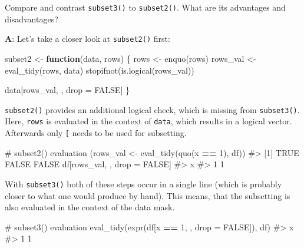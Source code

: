 \documentclass[
]{krantz}
\makeatletter
\newenvironment{Shaded}{\begin{snugshade}}{\end{snugshade}}
\newcommand{\CommentTok}[1]{\textcolor[rgb]{0.56,0.35,0.01}{\textit{#1}}}
\newcommand{\ControlFlowTok}[1]{\textcolor[rgb]{0.13,0.29,0.53}{\textbf{#1}}}
\newcommand{\DataTypeTok}[1]{\textcolor[rgb]{0.13,0.29,0.53}{#1}}
\newcommand{\DecValTok}[1]{\textcolor[rgb]{0.00,0.00,0.81}{#1}}
\newcommand{\KeywordTok}[1]{\textcolor[rgb]{0.13,0.29,0.53}{\textbf{#1}}}
\newcommand{\NormalTok}[1]{#1}
\newcommand{\OperatorTok}[1]{\textcolor[rgb]{0.81,0.36,0.00}{\textbf{#1}}}
\newcommand{\OtherTok}[1]{\textcolor[rgb]{0.56,0.35,0.01}{#1}}
\newcommand{\StringTok}[1]{\textcolor[rgb]{0.31,0.60,0.02}{#1}}
\newenvironment{kframe}{%
\medskip{}
\setlength{\fboxsep}{.8em}
 \def\at@end@of@kframe{}%
 \ifinner\ifhmode%
  \def\at@end@of@kframe{\end{minipage}}%
  \begin{minipage}{\columnwidth}%
 \fi\fi%
 \def\FrameCommand##1{\hskip\@totalleftmargin \hskip-\fboxsep
 \colorbox{shadecolor}{##1}\hskip-\fboxsep
     \hskip-\linewidth \hskip-\@totalleftmargin \hskip\columnwidth}%
 \MakeFramed {\advance\hsize-\width
   \@totalleftmargin\z@ \linewidth\hsize
   \@setminipage}}%
 {\par\unskip\endMakeFramed%
 \at@end@of@kframe}
\renewenvironment{Shaded}{\begin{kframe}}{\end{kframe}}
\renewcommand{\KeywordTok} [1]{\textcolor[rgb]{0.00,0.44,0.13}{{#1}}}
\renewcommand{\DataTypeTok}[1]{\textcolor[rgb]{0.56,0.13,0.00}{{#1}}}
\renewcommand{\DecValTok}  [1]{\textcolor[rgb]{0.25,0.63,0.44}{{#1}}}
\renewcommand{\StringTok}  [1]{\textcolor[rgb]{0.25,0.44,0.63}{{#1}}}
\renewcommand{\CommentTok} [1]{\textcolor[rgb]{0.38,0.63,0.69}{{#1}}}
\renewcommand{\OtherTok}   [1]{\textcolor[rgb]{0.00,0.44,0.13}{{#1}}}
\renewcommand{\NormalTok}  [1]{{#1}}
\makeatother
\begin{document}
Compare and contrast \texttt{subset3()} to \texttt{subset2()}. What are its advantages and disadvantages?

\textbf{{A}}: Let's take a closer look at \texttt{subset2()} first:

\begin{Shaded}
\begin{Highlighting}[]
\NormalTok{subset2 <-}\StringTok{ }\ControlFlowTok{function}\NormalTok{(data, rows) \{}
\NormalTok{  rows <-}\StringTok{ }\KeywordTok{enquo}\NormalTok{(rows)}
\NormalTok{  rows_val <-}\StringTok{ }\KeywordTok{eval_tidy}\NormalTok{(rows, data)}
  \KeywordTok{stopifnot}\NormalTok{(}\KeywordTok{is.logical}\NormalTok{(rows_val))}
  
\NormalTok{  data[rows_val, , drop =}\StringTok{ }\OtherTok{FALSE}\NormalTok{]}
\NormalTok{\}}
\end{Highlighting}
\end{Shaded}

\texttt{subset2()} provides an additional logical check, which is missing from \texttt{subset3()}. Here, \texttt{rows} is evaluated in the context of \texttt{data}, which results in a logical vector. Afterwards only \texttt{{[}} needs to be used for subsetting.

\begin{Shaded}
\begin{Highlighting}[]
\CommentTok{# subset2() evaluation}
\NormalTok{(rows_val <-}\StringTok{ }\KeywordTok{eval_tidy}\NormalTok{(}\KeywordTok{quo}\NormalTok{(x }\OperatorTok{==}\StringTok{ }\DecValTok{1}\NormalTok{), df))}
\CommentTok{#> [1]  TRUE FALSE FALSE}
\NormalTok{df[rows_val, , drop =}\StringTok{ }\OtherTok{FALSE}\NormalTok{]}
\CommentTok{#>   x}
\CommentTok{#> 1 1}
\end{Highlighting}
\end{Shaded}

With \texttt{subset3()} both of these steps occur in a single line (which is probably closer to what one would produce by hand). This means, that the subsetting is also evaluated in the context of the data mask.

\begin{Shaded}
\begin{Highlighting}[]
\CommentTok{# subset3() evaluation}
\KeywordTok{eval_tidy}\NormalTok{(}\KeywordTok{expr}\NormalTok{(df[x }\OperatorTok{==}\StringTok{ }\DecValTok{1}\NormalTok{, , }\DataTypeTok{drop =} \OtherTok{FALSE}\NormalTok{]), df)}
\CommentTok{#>   x}
\CommentTok{#> 1 1}
\end{Highlighting}
\end{Shaded}
\end{document}
